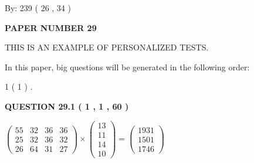 \documentclass[12pt]{article}
\begin{document}
   
\hspace{1.0in} By: 
         239 (          26 ,           34 )
   
   
   
   
\newpage 
\setcounter{page}{ 
    29001 } 
   
   
   
   
 {\textbf{ \Large{ PAPER NUMBER           29  }}}
   
   
\vspace{0.2in}
   
   
   
   
   
   
 \vspace{0.2in}
{\Huge  THIS IS AN EXAMPLE OF}
{\Huge  PERSONALIZED TESTS. }
   
   
   
\vspace{0.2in}
   
In this paper, big questions will be generated in the following order: 
   
   
             1 (           1 )
 .
  
\vspace{0.2in}
  
{\textbf{\Large{QUESTION
29.1 
 (           1 ,           1 ,          60 )
}}}
  
  
 
 
\noindent{}

 
$\left( \begin{array}{ccccccccccccccc}
          55  & 
          32  & 
          36  & 
          36  \\ 
          25  & 
          32  & 
          36  & 
          32  \\ 
          26  & 
          64  & 
          31  & 
          27
\end{array}\right) \times
\left( \begin{array}{c}
          13  \\ 
          11  \\ 
          14  \\ 
          10
\end{array}\right)  =
\left( \begin{array}{c}
        1931  \\ 
        1501  \\ 
        1746
\end{array}\right)  $
 
\end{document}
